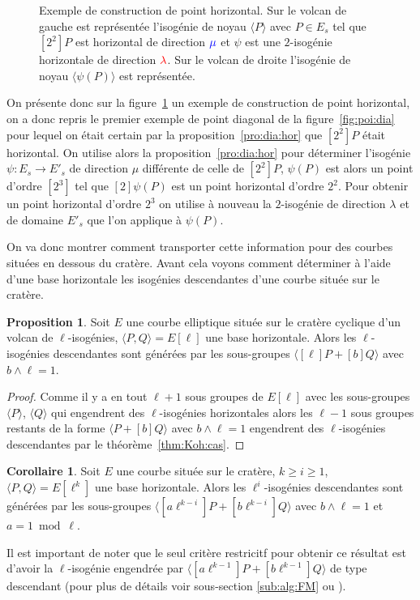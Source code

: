 \documentclass[10pt,a4paper]{book}
\theoremstyle{plain}
\theoremstyle{definition}
\theoremstyle{definition}
\newtheorem{cor}[thm]{Corollaire}
\theoremstyle{definition}
\newtheorem{prop}[thm]{Proposition}
\theoremstyle{definition}
\theoremstyle{remark}
\theoremstyle{remark}
\theoremstyle{definition}
\begin{document}
\begin{figure}
\begin{center}
\begin{tikzpicture}[scale=0.50]
\end{tikzpicture}
\end{center}
\caption{ \label{fig:poi:hor} Exemple de construction de point horizontal. 
Sur le volcan de gauche est représentée  l'isogénie de noyau $\langle P 
\rangle$ avec $P \in E_s$  tel que $[2^2]P$ est horizontal de direction 
$\color{blue}{\mu}$ et $\psi$ est une $2$-isogénie horizontale de direction 
$\color{red}{\lambda}$. Sur le volcan de droite l'isogénie de noyau $\langle 
\psi(P) \rangle$ est représentée.}
\end{figure}

On présente donc sur la figure~\ref{fig:poi:hor} un exemple de construction de 
point horizontal, on a donc repris le premier exemple de point 
diagonal de la figure~\ref{fig:poi:dia} pour lequel on était certain par la 
proposition~\ref{pro:dia:hor} que $[2^2]P$ était horizontal. On utilise alors 
la proposition~\ref{pro:dia:hor} pour déterminer l'isogénie $\psi:E_s 
\rightarrow E'_s$ de direction $\mu$ différente de celle de $[2^2]P$, $\psi(P)$
est alors un point d'ordre $[2^3]$ tel que $[2]\psi(P)$ est un point horizontal 
d'ordre $2^2$. Pour obtenir un point horizontal d'ordre $2^3$ on utilise à 
nouveau la $2$-isogénie de direction $\lambda$ et de domaine $E'_s$ que l'on 
applique à $\psi(P)$.

On va donc montrer comment transporter cette information pour des courbes 
situées en dessous du cratère. Avant cela voyons comment déterminer à l'aide 
d'une base horizontale les isogénies descendantes d'une courbe située sur le 
cratère.

\begin{prop}
Soit $E$ une courbe elliptique située sur le cratère cyclique d'un volcan de $\ell$-isogénies, $\langle P, Q \rangle= E[\ell]$ une base horizontale. Alors les $\ell$-isogénies descendantes sont générées par les sous-groupes $\langle [\ell]P+ [b]Q \rangle$ avec $b \wedge \ell =1$.
\end{prop}

\begin{proof}
Comme il y a en tout $\ell+1$ sous groupes de $E[\ell]$ avec les sous-groupes 
$\langle P \rangle$,  $\langle Q \rangle$ qui engendrent des $\ell$-isogénies 
horizontales alors les $\ell-1$ sous groupes restants de la forme 
$\langle P+ [b] Q \rangle$ avec $b \wedge \ell =1$ engendrent des 
$\ell$-isogénies descendantes par le théorème~\ref{thm:Koh:cas}.
\end{proof}

\begin{cor}
Soit $E$ une courbe située sur le cratère, $k\geqslant i \geqslant 1$, $\langle P, Q \rangle= E[\ell^k]$ une base horizontale. Alors les $\ell^i$-isogénies descendantes sont générées par les sous-groupes $\langle [a\ell^{k-i}]P+ [b\ell^{k-i}]Q \rangle$ avec $b \wedge \ell =1$ et $a = 1 \bmod \ell$.
\end{cor}
Il est important de noter que le seul critère restricitf pour obtenir ce résultat est d'avoir la $\ell$-isogénie engendrée par $\langle [a \ell^{k-1}]P+ [b \ell^{k-1}]Q \rangle $ de type descendant (pour plus de détails voir sous-section \ref{sub:alg:FM} ou \cite{FouquetMorain02}).
\end{document}
